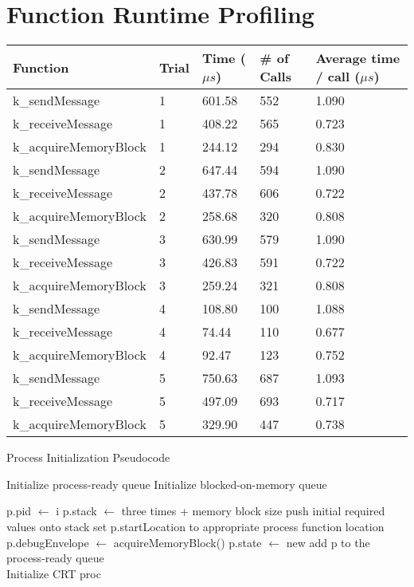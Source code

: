 \documentclass[12pt]{report}
\begin{document}
\section{Function Runtime Profiling}
\begin{tabular}{l | l | l | l | l}
    Function & Trial & Time ($\mu s$) & \# of Calls & Average time / call ($\mu s$) \\
    \hline
    k\_sendMessage&1&601.58&552&1.090 \\
    k\_receiveMessage&1&408.22&565&0.723 \\
    k\_acquireMemoryBlock&1&244.12&294&0.830 \\
    k\_sendMessage&2&647.44&594&1.090 \\
    k\_receiveMessage&2&437.78&606&0.722 \\
    k\_acquireMemoryBlock&2&258.68&320&0.808 \\
    k\_sendMessage&3&630.99&579&1.090 \\
    k\_receiveMessage&3&426.83&591&0.722 \\
    k\_acquireMemoryBlock&3&259.24&321&0.808 \\
    k\_sendMessage&4&108.80&100&1.088 \\
    k\_receiveMessage&4&74.44&110&0.677 \\
    k\_acquireMemoryBlock&4&92.47&123&0.752 \\
    k\_sendMessage&5&750.63&687&1.093 \\
    k\_receiveMessage&5&497.09&693&0.717 \\
    k\_acquireMemoryBlock&5&329.90&447&0.738 \\
\end{tabular}

\begin{algorithm}
    \caption{Process Initialization Pseudocode}
    \label{code:proc_init}
    \begin{algorithmic}[1]
        \State Initialize process-ready queue
        \State Initialize blocked-on-memory queue

            \State p.pid $\gets$ i
            \State p.stack $\gets$  three times + memory block size 
            \State push initial required values onto stack
            \State set p.startLocation to appropriate process function location
            \State p.debugEnvelope $\gets$ acquireMemoryBlock()
            \State p.state $\gets$ new
            \State add p to the process-ready queue
        \EndFor \\
        \State Initialize CRT proc
    \EndFunction
    \end{algorithmic}
\end{algorithm}
\end{document}
